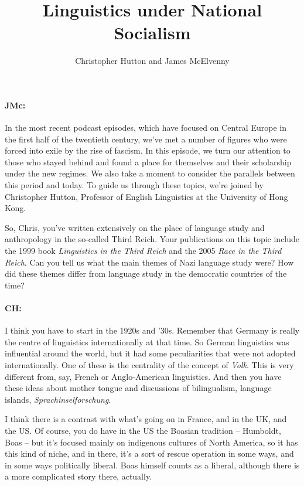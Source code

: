 \documentclass[output=paper]{langscibook}
\author{Christopher Hutton\orcid{}\affiliation{University of Hong Kong} and James McElvenny\affiliation{University of Siegen}}
\title{Linguistics under National Socialism}
\begin{document}
\maketitle 

\paragraph*{JMc:} In the most recent podcast episodes, which have focused on Central Europe in the first half of the twentieth century, we’ve met a number of figures who were forced into exile by the rise of fascism. In this episode, we turn our attention to those who stayed behind and found a place for themselves and their scholarship under the new regimes. We also take a moment to consider the parallels between this period and today. To guide us through these topics, we’re joined by Christopher Hutton, Professor of English Linguistics at the University of Hong Kong.

So, Chris, you’ve written extensively on the place of language study and anthropology in the so-called Third Reich. Your publications on this topic include the 1999 book \textit{Linguistics in the Third Reich} and the 2005 \textit{Race in the Third Reich}. Can you tell us what the main themes of Nazi language study were? How did these themes differ from language study in the democratic countries of the time?

\paragraph*{CH:} I think you have to start in the 1920s and ’30s. Remember that Germany is really the centre of linguistics internationally at that time. So German linguistics was influential around the world, but it had some peculiarities that were not adopted internationally. One of these is the centrality of the concept of \textit{Volk}. This is very different from, say, French or Anglo-American linguistics. And then you have these ideas about mother tongue and discussions of bilingualism, language islands, \textit{Sprachinselforschung}.

I think there is a contrast with what’s going on in France, and in the UK, and the US. Of course, you do have in the US the Boasian tradition – Humboldt, Boas – but it’s focused mainly on indigenous cultures of North America, so it has this kind of niche, and in there, it’s a sort of rescue operation in some ways, and in some ways politically liberal. Boas himself counts as a liberal, although there is a more complicated story there, actually.
\end{document}
